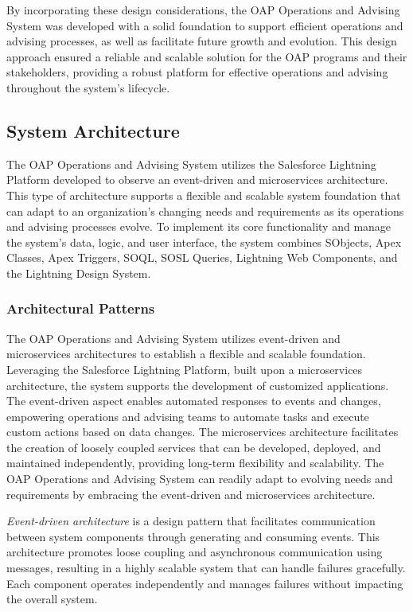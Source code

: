 \documentclass[12pt]{article}
\begin{document}
By incorporating these design considerations, the OAP Operations and Advising System was developed with a solid foundation to support efficient operations and advising processes, as well as facilitate future growth and evolution. This design approach ensured a reliable and scalable solution for the OAP programs and their stakeholders, providing a robust platform for effective operations and advising throughout the system's lifecycle.

\subsection{System Architecture}
The OAP Operations and Advising System utilizes the Salesforce Lightning Platform developed to observe an event-driven and microservices architecture. This type of architecture supports a flexible and scalable system foundation that can adapt to an organization's changing needs and requirements as its operations and advising processes evolve. To implement its core functionality and manage the system's data, logic, and user interface, the system combines SObjects, Apex Classes, Apex Triggers, SOQL, SOSL Queries, Lightning Web Components, and the Lightning Design System.

\subsubsection{Architectural Patterns}
The OAP Operations and Advising System utilizes event-driven and microservices architectures to establish a flexible and scalable foundation. Leveraging the Salesforce Lightning Platform, built upon a microservices architecture, the system supports the development of customized applications. The event-driven aspect enables automated responses to events and changes, empowering operations and advising teams to automate tasks and execute custom actions based on data changes. The microservices architecture facilitates the creation of loosely coupled services that can be developed, deployed, and maintained independently, providing long-term flexibility and scalability. The OAP Operations and Advising System can readily adapt to evolving needs and requirements by embracing the event-driven and microservices architecture.

\textit{Event-driven architecture} is a design pattern that facilitates communication between system components through generating and consuming events. This architecture promotes loose coupling and asynchronous communication using messages, resulting in a highly scalable system that can handle failures gracefully. Each component operates independently and manages failures without impacting the overall system.
\end{document}
